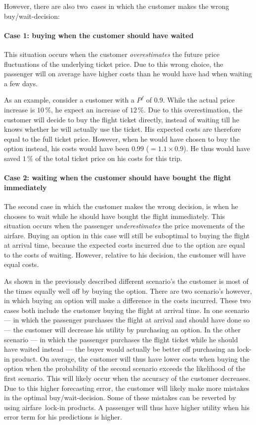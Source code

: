 However, there are also two~cases in which the customer makes the wrong buy/wait-decision:

\paragraph{Case 1: buying when the customer should have waited}

This situation occurs when the customer \emph{overestimates} the future price fluctuations of the underlying ticket price. Due to this wrong choice, the passenger will on average have higher costs than he would have had when waiting a few days.

As an example, consider a customer with a $P^f$ of $0.9$. While the actual price increase is $10\,\%$, he expect an increase of $12\,\%$. Due to this overestimation, the customer will decide to buy the flight ticket directly, instead of waiting till he knows whether he will actually use the ticket. His expected costs are therefore equal to the full ticket price. However, when he would have chosen to buy the option instead, his costs would have been $0.99$ ($= 1.1 \times 0.9$). He thus would have saved $1\,\%$ of the total ticket price on his costs for this trip.

\paragraph{Case 2: waiting when the customer should have bought the flight immediately}

The second case in which the customer makes the wrong decision, is when he chooses to wait while he should have bought the flight immediately. This situation occurs when the passenger \emph{underestimates} the price movements of the airfare. Buying an option in this case will still be suboptimal to buying the flight at arrival time, because the expected costs incurred due to the option are equal to the costs of waiting. However, relative to his decision, the customer will have equal costs.

As shown in the previously described different scenario's the customer is most of the times equally well off by buying the option. There are two scenario's however, in which buying an option will make a difference in the costs incurred. These two cases both include the customer buying the flight at arrival time. In one scenario --- in which the passenger purchases the flight at arrival and should have done so --- the customer will decrease his utility by purchasing an option. In the other scenario --- in which the passenger purchases the flight ticket while he should have waited instead --- the buyer would actually be better off purchasing an lock-in product. On average, the customer will thus have lower costs when buying the option when the probability of the second scenario exceeds the likelihood of the first scenario. This will likely occur when the accuracy of the customer decreases. Due to this higher forecasting error, the customer will likely make more mistakes in the optimal buy/wait-decision. Some of these mistakes can be reverted by using airfare~lock-in products. A passenger will thus have higher utility when his error term for his predictions is higher.

